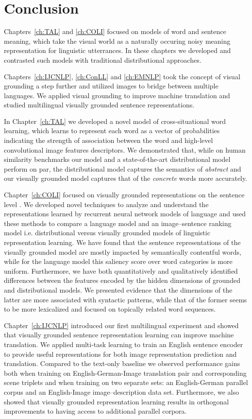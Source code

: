 \section{Conclusion}

Chapters~\ref{ch:TAL} and \ref{ch:COLI} focused on models of word and sentence meaning, 
which take the visual world as a naturally occuring noisy meaning representation for linguistic utterrances. 
In these chapters we developed and contrasted such models with traditional distributional approaches. 

Chapters~\ref{ch:IJCNLP}, \ref{ch:ConLL} and \ref{ch:EMNLP} took the concept of visual grounding 
a step further and utilized images to bridge between multiple languages. We applied visual grounding 
to improve machine translation and studied multilingual visually grounded sentence representations.


In Chapter~\ref{ch:TAL} we developed a novel model of cross-situational word learning, which learns to represent
each word as a vector of probabilities indicating the strength of association between the word and high-level 
convolutional image features descriptors. 
We demonstrated that, while on human similarity benchmarks our model and a state-of-the-art distributional model 
perform on par, the distributional model captures the semantics of \emph{abstract} and our visually grounded model 
captures that of the \emph{concrete} words more accurately.
  
Chapter~\ref{ch:COLI} focused on visually grounded representations on the sentence level . 
We developed novel techniques to analyze and understand the representations learned by recurrent
neural network models of language and used these methods to compare a language model and an image--sentence ranking
model i.e. distributional versus visually grounded models of linguistic representation learning. We have found that the 
sentence representations of the visually grounded model are mostly impacted by semantically contentful words, while
for the language model this saliency score over word categories is more uniform. Furthermore, we have 
both quantitatively and qualitatively identified differences between the features encoded by the hidden dimensions
of grounded and distributional models. We presented evidence that
the dimensions of the latter are more associated with syntactic patterns, while  that of the former seems 
to be more lexicalized and focused on topically related word sequences.

Chapter~\ref{ch:IJCNLP} introduced our first multilingual experiment and showed that visually grounded sentence
representation learning can improve machine translation. 
We applied multi-task learning to train an English sentence encoder to provide useful representations for both
image representation prediction and translation. Compared to the text-only baseline 
we observed performance gains both when 
training on English-German-Image translation pair and corresponding scene triplets and when training on two separate
sets: an English-German parallel corpus and an English-Image image--description data set. 
Furthermore, we also showed that visually grounded representation learning results in orthogonal 
improvements to having access to additional parallel corpora.

